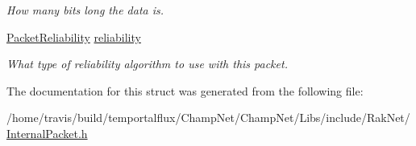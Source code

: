 \begin{DoxyCompactItemize}
\begin{DoxyCompactList}\small\item\em How many bits long the data is. \end{DoxyCompactList}\item 
\hypertarget{struct_rak_net_1_1_internal_packet_fixed_size_transmission_header_a6737b01446c2c61287cbc27382034fd0}{\hyperlink{_packet_priority_8h_ae41fa01235e99dced384d137fa874a7e}{Packet\-Reliability} \hyperlink{struct_rak_net_1_1_internal_packet_fixed_size_transmission_header_a6737b01446c2c61287cbc27382034fd0}{reliability}}\label{struct_rak_net_1_1_internal_packet_fixed_size_transmission_header_a6737b01446c2c61287cbc27382034fd0}

\begin{DoxyCompactList}\small\item\em What type of reliability algorithm to use with this packet. \end{DoxyCompactList}\end{DoxyCompactItemize}


The documentation for this struct was generated from the following file\-:\begin{DoxyCompactItemize}
\item 
/home/travis/build/temportalflux/\-Champ\-Net/\-Champ\-Net/\-Libs/include/\-Rak\-Net/\hyperlink{_internal_packet_8h}{Internal\-Packet.\-h}\end{DoxyCompactItemize}
